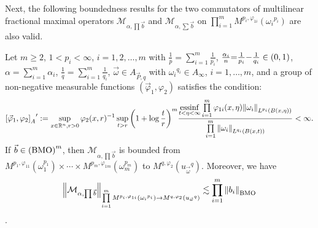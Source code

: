 \documentclass[11pt, twoside, leqno]{article}
\begin{document}
Next, the following boundedness results for the two commutators of multilinear fractional maximal operators ${\mathcal{M}_{\alpha, \prod \vec b }}$ and ${{\mathcal M}_{\alpha ,\sum {\vec b} }}$ on $\prod\limits_{i = 1}^m {{M^{{p_i},{\varphi _{1i}}}}\left( {{\omega _i}^{p_i}} \right)}$ are also valid.

\begin{thm}\label{CFRM}
	Let $m\geq 2$, $1< p_i<\infty$, $i=1,2,\ldots,m$ with $\frac{1}{p} = \sum\limits_{i = 1}^m {\frac{1}{{{p_i}}}}$, $\frac{{{\alpha _i}}}{n}{\rm{ = }}\frac{1}{{{p_i}}}{\rm{ - }}\frac{1}{{{q_i}}} \in (0,1)$, $\alpha  = \sum\limits_{i = 1}^m {{\alpha _i}}$, $\frac{1}{q} = \sum\limits_{i = 1}^m {\frac{1}{{{q_i}}}}$, $\vec{\omega}\in {A_{\vec P,q}}$ with ${\omega _i}^{{q_i}} \in {A_\infty }$, $i = 1, \ldots ,m$, and a group of non-negative measurable functions $({{\vec \varphi }_1},{\varphi _2})$ satisfies the condition:
	\begin{equation}\label{con6}
	{\left[ {{{\vec \varphi }_1},{\varphi _2}} \right]_A}^\prime : = \mathop {\sup }\limits_{x \in {{\mathbb R^n}},r > 0} {\varphi _2}{(x,r)^{{\rm{ - }}1}}\mathop {\sup }\limits_{t > r} {\left( {1 + \log \frac{t}{r}} \right)^m}\frac{{\mathop {{\rm{essinf}}}\limits_{t < \eta  < \infty } \prod\limits_{i = 1}^m {{\varphi _{1i}}(x,\eta ){{\left\| {{\omega _i}} \right\|}_{{L^{{p_i}}}(B(x,\eta ))}}} }}{{\prod\limits_{i = 1}^m {{{\left\| {{\omega _i}} \right\|}_{{L^{{q_i}}}(B(x,t))}}} }} < \infty.
	\end{equation}
	If $\vec b \in {\left( {\rm BMO} \right)^m}$, then ${\mathcal{M}_{\alpha, \prod \vec b }}$ is bounded from ${M^{{p_1},{\varphi _{11}}}}(\omega _1^{{p_1}}) \times  \cdots  \times {M^{{p_m},{\varphi _{1m}}}}(\omega _m^{{p_m}})$ to ${M^{q,{\varphi _2}}}({u_{\vec \omega }}^q)$. Moreover, we have 
	$${\left\| {\mathcal{M}_{\alpha, \prod \vec b }} \right\|_{\prod\limits_{i = 1}^m {{M^{{p_i},{\varphi _{1i}}}}\left( {{\omega _i}^{{p_i}}} \right)}  \to {M^{q,{\varphi _2}}}\left( {{u_{\vec \omega }}^q} \right)}} \lesssim \prod\limits_{i = 1}^m {{{\left\| {{b_i}} \right\|}_{\rm BMO}}}$$.
\end{thm}
\end{document}

